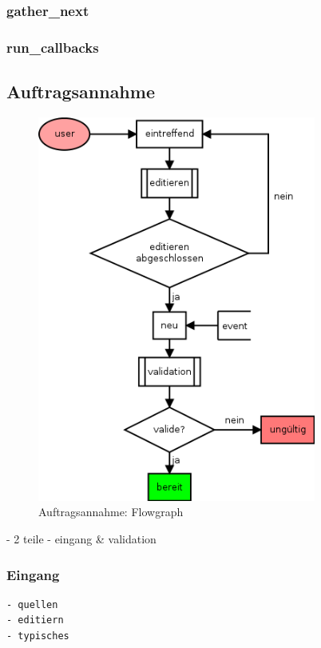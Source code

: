 \subsubsection{gather\_next}
\subsubsection{run\_callbacks}


\subsection{Auftragsannahme}


\begin{figure}[ht] 
  \label{fig:lebenszyklus-auftrag-eingang}
  \begin{center}
      \includegraphics[height=5in]{imageinput/lebenszyklus-auftrag-eingang.png}
  \end{center}
  \caption{Auftragsannahme: Flowgraph}
\end{figure}

- 2 teile
- eingang \& validation


\subsubsection{Eingang}

\begin{verbatim}
- quellen
- editiern
- typisches
\end{verbatim}

